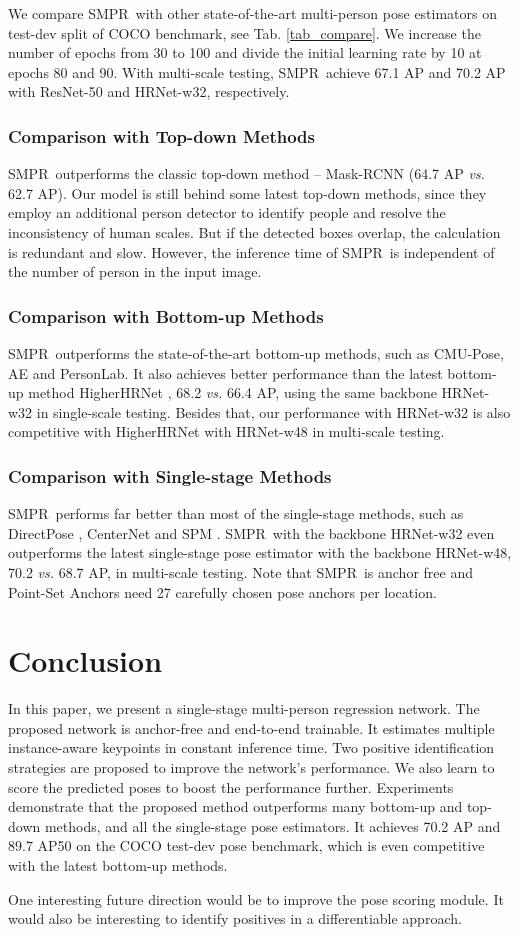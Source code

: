 \documentclass[11pt,twocolumn,journal]{IEEEtran}
\newcommand{\vs}{\emph{vs.} }
\newcommand{\tab}{Tab. }
\newcommand{\SMPR}{SMPR}
\begin{document}
We compare \SMPR~with other state-of-the-art multi-person pose estimators on test-dev split of COCO benchmark, see \tab\ref{tab_compare}. We increase the number of epochs from 30 to 100 and divide the initial learning rate by 10 at epochs 80 and 90. With multi-scale testing, \SMPR~achieve 67.1 AP and 70.2 AP with ResNet-50 and HRNet-w32, respectively.

\subsubsection{Comparison with Top-down Methods}
\SMPR~outperforms the classic top-down method -- Mask-RCNN (64.7 AP \vs 62.7 AP). Our model is still behind some latest top-down methods, since they employ an additional person detector to identify people and resolve the inconsistency of human scales. But if the detected boxes overlap, the calculation is redundant and slow. However, the inference time of \SMPR~is independent of the number of person in the input image.

\subsubsection{Comparison with Bottom-up Methods}
\SMPR~outperforms the state-of-the-art bottom-up methods, such as CMU-Pose, AE and PersonLab. 
It also achieves better performance than the latest bottom-up method HigherHRNet \cite{higherhrnet2020}, 68.2 \vs 66.4 AP, using the same backbone HRNet-w32 in single-scale testing. Besides that, our performance with HRNet-w32 is also competitive with HigherHRNet with HRNet-w48 in multi-scale testing. 


\subsubsection{Comparison with Single-stage Methods}
\SMPR~performs far better than most of the single-stage methods, such as DirectPose \cite{directpose19}, CenterNet \cite{centernet19} and SPM \cite{spm19}. 
\SMPR~with the backbone HRNet-w32 even outperforms the latest single-stage pose estimator \cite{pointset20} with the backbone HRNet-w48, 70.2 \vs 68.7 AP, in multi-scale testing. Note that \SMPR~is anchor free and Point-Set Anchors need 27 carefully chosen pose anchors per location. 


%
 
\section{Conclusion}
In this paper, we present a single-stage multi-person regression network. The proposed network is anchor-free and end-to-end trainable. It estimates multiple instance-aware keypoints in constant inference time. 
Two positive identification strategies are proposed to improve the network's performance. We also learn to score the predicted poses to boost the performance further. 
Experiments demonstrate that the proposed method outperforms many bottom-up and top-down methods, and all the single-stage pose estimators. It achieves 70.2 AP and 89.7 AP50 on the COCO test-dev pose benchmark, which is even competitive with the latest bottom-up methods. 

One interesting future direction would be to improve the pose scoring module. It would also be interesting to identify positives in a differentiable approach.   


{\small


}
\end{document}

